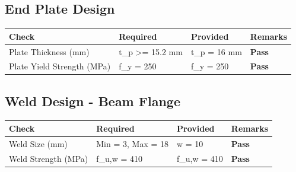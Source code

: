 \documentclass{article}%
\begin{document}
%
%
\subsection{End Plate Design}%
\label{subsec:EndPlateDesign}%
\renewcommand{\arraystretch}{1.2}%
\begin{longtable}{|p{3.5cm}|p{6cm}|p{5cm}|p{1.5cm}|}%
\hline%
\rowcolor{OsdagGreen}%
Check&Required&Provided&Remarks\\%
\hline%
\endhead%
\hline%
Plate Thickness (mm)&t\_p >= 15.2 mm&t\_p = 16 mm&\textcolor{OsdagGreen}{%
\textbf{Pass}%
}\\%
\hline%
Plate Yield Strength (MPa)&f\_y = 250&f\_y = 250&\textcolor{OsdagGreen}{%
\textbf{Pass}%
}\\%
\hline%
\end{longtable}

%
%
\subsection{Weld Design {-} Beam Flange}%
\label{subsec:WeldDesign{-}BeamFlange}%
\renewcommand{\arraystretch}{1.2}%
\begin{longtable}{|p{3.5cm}|p{6.3cm}|p{5.5cm}|p{1.2cm}|}%
\hline%
\rowcolor{OsdagGreen}%
Check&Required&Provided&Remarks\\%
\hline%
\endhead%
\hline%
Weld Size (mm)&Min = 3, Max = 18&w = 10&\textcolor{OsdagGreen}{%
\textbf{Pass}%
}\\%
\hline%
Weld Strength (MPa)&f\_u,w = 410&f\_u,w = 410&\textcolor{OsdagGreen}{%
\textbf{Pass}%
}\\%
\hline%
\end{longtable}

%
\end{document}
